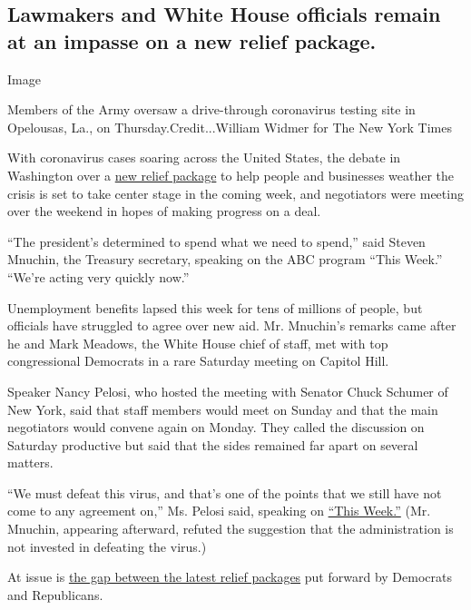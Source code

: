 \hypertarget{lawmakers-and-white-house-officials-remain-at-an-impasse-on-a-new-relief-package}{%
\subsection{Lawmakers and White House officials remain at an impasse on
a new relief
package.}\label{lawmakers-and-white-house-officials-remain-at-an-impasse-on-a-new-relief-package}}

Image

Members of the Army oversaw a drive-through coronavirus testing site in
Opelousas, La., on Thursday.Credit...William Widmer for The New York
Times

With coronavirus cases soaring across the United States, the debate in
Washington over a
\href{https://www.nytimes.com/2020/07/28/us/politics/coronavirus-relief-bills-house-senate.html}{new
relief package} to help people and businesses weather the crisis is set
to take center stage in the coming week, and negotiators were meeting
over the weekend in hopes of making progress on a deal.

``The president's determined to spend what we need to spend,'' said
Steven Mnuchin, the Treasury secretary, speaking on the ABC program
``This Week.'' ``We're acting very quickly now.''

Unemployment benefits lapsed this week for tens of millions of people,
but officials have struggled to agree over new aid. Mr. Mnuchin's
remarks came after he and Mark Meadows, the White House chief of staff,
met with top congressional Democrats in a rare Saturday meeting on
Capitol Hill.

Speaker Nancy Pelosi, who hosted the meeting with Senator Chuck Schumer
of New York, said that staff members would meet on Sunday and that the
main negotiators would convene again on Monday. They called the
discussion on Saturday productive but said that the sides remained far
apart on several matters.

``We must defeat this virus, and that's one of the points that we still
have not come to any agreement on,'' Ms. Pelosi said, speaking on
\href{https://abcnews.go.com/ThisWeek/video/speaker-house-nancy-pelosi-72130729}{``This
Week.''} (Mr. Mnuchin, appearing afterward, refuted the suggestion that
the administration is not invested in defeating the virus.)

At issue is
\href{https://www.nytimes.com/2020/07/28/us/politics/coronavirus-relief-bills-house-senate.html}{the
gap between the latest relief packages} put forward by Democrats and
Republicans.

